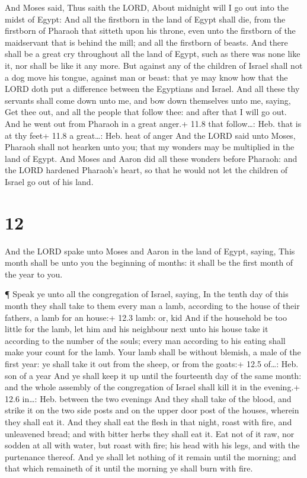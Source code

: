  And Moses said, Thus saith the LORD, About midnight will I
go out into the midst of Egypt:  And all the firstborn in
the land of Egypt shall die, from the firstborn of Pharaoh that sitteth
upon his throne, even unto the firstborn of the maidservant that is
behind the mill; and all the firstborn of beasts.  And there
shall be a great cry throughout all the land of Egypt, such as there was
none like it, nor shall be like it any more.  But against
any of the children of Israel shall not a dog move his tongue, against
man or beast: that ye may know how that the LORD doth put a difference
between the Egyptians and Israel.  And all these thy
servants shall come down unto me, and bow down themselves unto me,
saying, Get thee out, and all the people that follow thee: and after
that I will go out. And he went out from Pharaoh in a great anger.+ 11.8
that follow\ldots: Heb. that is at thy feet+ 11.8 a great\ldots: Heb.
heat of anger  And the LORD said unto Moses, Pharaoh shall
not hearken unto you; that my wonders may be multiplied in the land of
Egypt.  And Moses and Aaron did all these wonders before
Pharaoh: and the LORD hardened Pharaoh's heart, so that he would not let
the children of Israel go out of his land.

\hypertarget{section-11}{%
\section{12}\label{section-11}}

 And the LORD spake unto Moses and Aaron in the land of
Egypt, saying,  This month shall be unto you the beginning
of months: it shall be the first month of the year to you.

 ¶ Speak ye unto all the congregation of Israel, saying, In
the tenth day of this month they shall take to them every man a lamb,
according to the house of their fathers, a lamb for an house:+ 12.3
lamb: or, kid  And if the household be too little for the
lamb, let him and his neighbour next unto his house take it according to
the number of the souls; every man according to his eating shall make
your count for the lamb.  Your lamb shall be without
blemish, a male of the first year: ye shall take it out from the sheep,
or from the goats:+ 12.5 of\ldots: Heb. son of a year  And
ye shall keep it up until the fourteenth day of the same month: and the
whole assembly of the congregation of Israel shall kill it in the
evening.+ 12.6 in\ldots: Heb. between the two evenings  And
they shall take of the blood, and strike it on the two side posts and on
the upper door post of the houses, wherein they shall eat it.
 And they shall eat the flesh in that night, roast with
fire, and unleavened bread; and with bitter herbs they shall eat it.
 Eat not of it raw, nor sodden at all with water, but roast
with fire; his head with his legs, and with the purtenance thereof.
 And ye shall let nothing of it remain until the morning;
and that which remaineth of it until the morning ye shall burn with
fire.

